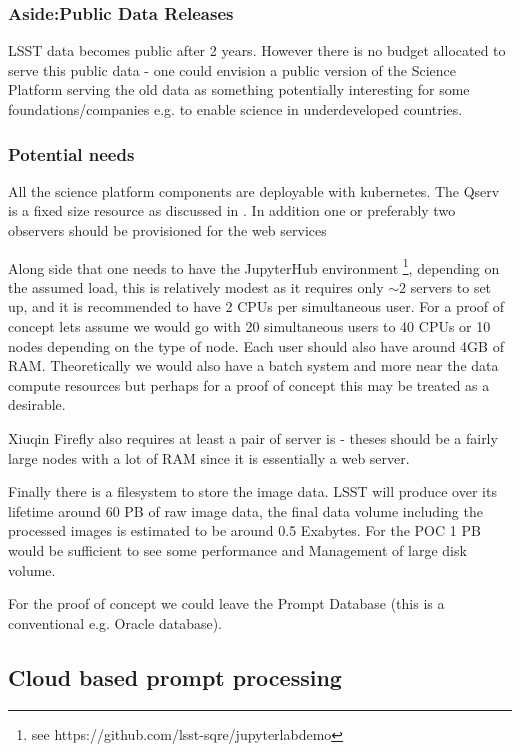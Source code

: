 \subsubsection {Aside:Public Data Releases}
LSST data becomes public after 2 years. However there is no budget allocated to serve this public data - one could envision a public version of the Science Platform serving the old data as something potentially interesting for some foundations/companies e.g. to enable science in underdeveloped countries.

\subsubsection {Potential needs}
All the science platform components are deployable with kubernetes.  The Qserv is a fixed size resource as discussed in .
In addition one or preferably two observers should be provisioned for the  web services

Along side that one needs to have the JupyterHub environment \footnote{see https://github.com/lsst-sqre/jupyterlabdemo},  depending on the assumed load, this is relatively modest as it requires only $\sim2$ servers to set up, and it is recommended to have 2 CPUs per simultaneous user. For a proof of concept lets assume we would go with 20 simultaneous users to 40 CPUs or 10 nodes depending on the type of node. Each user should also have around 4GB of RAM.
Theoretically we would also have a batch system and more near the data compute resources but perhaps for a proof of concept this may be treated as a desirable.

{\color{red} Xiuqin }
Firefly also requires at least a pair of  server is - theses should be a fairly large nodes with a lot of RAM since it is essentially a web server.

Finally there is a filesystem to store the image data. LSST will produce over its lifetime around 60 PB of raw image data,  the final data volume including the processed images is estimated to be around 0.5 Exabytes.  For the POC 1 PB would be sufficient to see some performance and Management of large disk volume.

For the proof of concept we could leave the Prompt Database (this is a conventional e.g. Oracle database).

\subsection{Cloud based prompt processing}\label{sect:pp}

